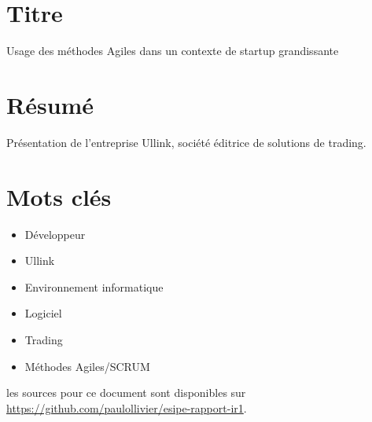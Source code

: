 \begin{titlepage}
\begin{center}
\section*{Titre}
Usage des méthodes Agiles dans un contexte de startup grandissante

\section*{Résumé}
Présentation de l'entreprise Ullink, société éditrice de solutions de trading.

\section*{Mots clés}
\begin{multicols}{2}
\begin{itemize}
\item Développeur
\item Ullink
\item Environnement informatique
\item Logiciel
\item Trading
\item Méthodes Agiles/SCRUM
\end{itemize}
\end{multicols}



\vfill
les sources pour ce document sont disponibles sur \url{https://github.com/paulollivier/esipe-rapport-ir1}.
\end{center}
\end{titlepage}
